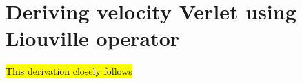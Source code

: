 \section{Deriving velocity Verlet using Liouville operator\label{sec:liou}\label{appendix:liouville_verlet}}
\newcommand{\Liou}{i\hat{\vec L}}
\newcommand{\Lop}{\hat{\mathcal{U}}}
\hl{This derivation closely follows }\cite[section 4.3.3]{frenkel2001understanding}






